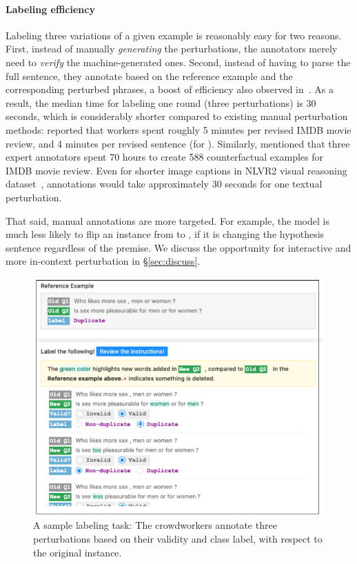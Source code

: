 \paragraph{Labeling efficiency}
Labeling three variations of a given example is reasonably easy for two reasons. 
First, instead of manually \emph{generating} the perturbations, the annotators merely need to \emph{verify} the machine-generated ones.
Second, instead of having to parse the full sentence, they annotate based on the reference example and the corresponding perturbed phrases, a boost of efficiency also observed in~\cite{Khashabi2020MoreBF}.
As a result, the median time for labeling one round (three perturbations) is 30 seconds, which is considerably shorter compared to existing manual perturbation methods:
\citet{kaushik2019learning}reported that workers spent roughly 5 minutes per revised IMDB movie review, and 4 minutes per revised sentence (for \nli).
Similarly, \citet{gardner2020contrast} mentioned that three expert annotators spent 70 hours to create 588 counterfactual examples for IMDB movie review.
Even for shorter image captions in NLVR2 visual reasoning dataset~\cite{suhr2018corpus}, annotations would take approximately 30 seconds for one textual perturbation.


That said, manual annotations are more targeted. 
For example, the model is much less likely to flip an \nli instance from  to , if it is changing the hypothesis sentence regardless of the premise.
We discuss the opportunity for interactive and more in-context perturbation in \S\ref{sec:discuss}.



\begin{figure}[t]
\centering
\includegraphics[width=1\columnwidth]{figures/mturk_label}
\vspace{-15pt}
\caption{A sample labeling task: The crowdworkers annotate three perturbations based on their validity and class label, with respect to the original instance. }
\vspace{-10pt}
\label{fig:mturk_instruction}
\end{figure}

